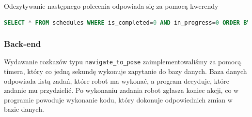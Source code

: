 \documentclass[12pt]{article}
\newcommand{\vsp}{\vspace{0.5cm}}
\begin{document}
\vsp
\vsp

\noindent Odczytywanie następnego polecenia odpowiada się za pomocą kwerendy

\vsp 

\begin{lstlisting}[language=SQL]
SELECT * FROM schedules WHERE is_completed=0 AND in_progress=0 ORDER BY timestamp
\end{lstlisting}



\newpage
\subsubsection*{Back-end}

Wydawanie rozkazów typu \texttt{navigate\_to\_pose} zaimplementowaliśmy za pomocą timera, który co jedną sekundę wykonuje zapytanie do bazy danych. Baza danych odpowiada listą zadań, które robot ma wykonać, a program decyduje, które zadanie mu przydzielić. Po wykonaniu zadania robot zgłasza koniec akcji, co w programie powoduje wykonanie kodu, który dokonuje odpowiednich zmian w bazie danych.

\vsp
\end{document}
